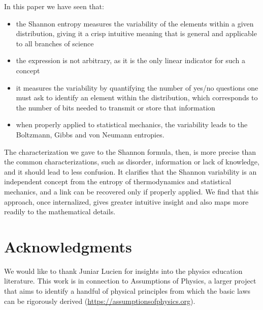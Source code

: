 \documentclass[iopart]{revtex4-1}
\begin{document}
In this paper we have seen that:
\begin{itemize}
	\item the Shannon entropy measures the variability of the elements within a given distribution, giving it a crisp intuitive meaning that is general and applicable to all branches of science
	\item the expression is not arbitrary, as it is the only linear indicator for such a concept
	\item it measures the variability by quantifying the number of yes/no questions one must ask to identify an element within the distribution, which corresponds to the number of bits needed to transmit or store that information
	\item when properly applied to statistical mechanics, the variability leads to the Boltzmann, Gibbs and von Neumann entropies.
\end{itemize}
The characterization we gave to the Shannon formula, then, is more precise than the common characterizations, such as disorder, information or lack of knowledge, and it should lead to less confusion. It clarifies that the Shannon variability is an independent concept from the entropy of thermodynamics and statistical mechanics, and a link can be recovered only if properly applied. We find that this approach, once internalized, gives greater intuitive insight and also maps more readily to the mathematical details.

\section{Acknowledgments}
We would like to thank Juniar Lucien for insights into the physics education literature. This work is in connection to Assumptions of Physics, a larger project that aims to identify a handful of physical principles from which the basic laws can be rigorously derived  (\url{https://assumptionsofphysics.org}).

  

\end{document}
